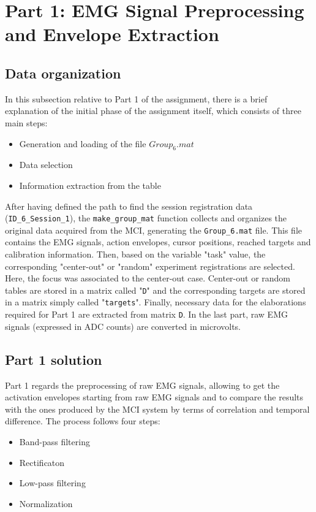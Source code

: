 
\vspace{10pt}
\section{Part 1: EMG Signal Preprocessing and Envelope Extraction}

\subsection{Data organization}
In this subsection relative to Part 1 of the assignment, there is a brief explanation of the initial phase of the assignment itself, which consists of three main steps:
\begin{itemize}
    \item Generation and loading of the file $Group_6.mat$
    \item Data selection
    \item Information extraction from the table
\end{itemize}

After having defined the path to find the session registration data (\texttt{ID\_6\_Session\_1}), the \texttt{make\_group\_mat} function collects and organizes the original data acquired from the MCI, generating the \texttt{Group\_6.mat} file. This file contains the EMG signals, action envelopes, cursor positions, reached targets and calibration information. 
Then, based on the variable "task" value, the corresponding "center-out" or "random" experiment registrations are selected. Here, the focus was associated to the center-out case.
Center-out or random tables are stored in a matrix called "\texttt{D}" and the corresponding targets are stored in a matrix simply called "\texttt{targets}".
Finally, necessary data for the elaborations required for Part 1 are extracted from matrix \texttt{D}.
In the last part, raw EMG signals (expressed in ADC counts) are converted in microvolts. 

\subsection{Part 1 solution}
Part 1 regards the preprocessing of raw EMG signals, allowing to get the activation envelopes starting from raw EMG signals and to compare the results with the ones produced by the MCI system by terms of correlation and temporal difference.
The process follows four steps:
\begin{itemize}
    \item Band-pass filtering
    \item Rectificaton
    \item Low-pass filtering
    \item Normalization
\end{itemize}

